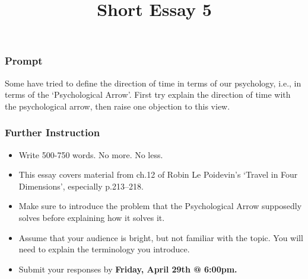 \documentclass[]{article}
\title{Short Essay 5}
\date{}
\begin{document}
\maketitle

\subsubsection{Prompt}\label{prompt}

Some have tried to define the direction of time in terms of our
psychology, i.e., in terms of the `Psychological Arrow'. First try
explain the direction of time with the psychological arrow, then raise
one objection to this view.

\subsubsection{Further Instruction}\label{further-instruction}

\begin{itemize}
\itemsep1pt\parskip0pt
\item
  Write 500-750 words. No more. No less.
\item
  This essay covers material from ch.12 of Robin Le Poidevin's `Travel
  in Four Dimensions', especially p.213--218.
\item
  Make sure to introduce the problem that the Psychological Arrow
  supposedly solves before explaining how it solves it.
\item
  Assume that your audience is bright, but not familiar with the topic.
  You will need to explain the terminology you introduce.
\item
  Submit your responses by \textbf{Friday, April 29th @ 6:00pm.}
\end{itemize}
\end{document}
